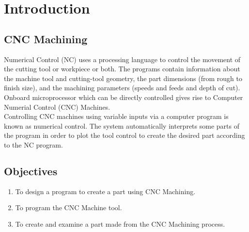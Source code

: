 \chapter{Introduction}
\lhead{\leftmark}
\label{sec:introduction}
\section{CNC Machining}
Numerical Control (NC) uses a processing language to control the movement of the cutting tool or workpiece or both. The programs contain information about the machine tool and cutting-tool geometry, the part dimensions (from rough to finish size), and the machining parameters (speeds and feeds and depth of cut). Onboard microprocessor which can be directly controlled gives rise to Computer Numerial Control (CNC) Machines.\\
Controlling CNC machines using variable inputs via a computer program is known as numerical control. The system automatically interprets some parts of the program in order to plot the tool control to create the desired part according to the NC program.
\section{Objectives}
\begin{enumerate}
	\item To design a program to create a part using CNC Machining.
	\item To program the CNC Machine tool.
	\item To create and examine a part made from the CNC Machining process.
\end{enumerate}

